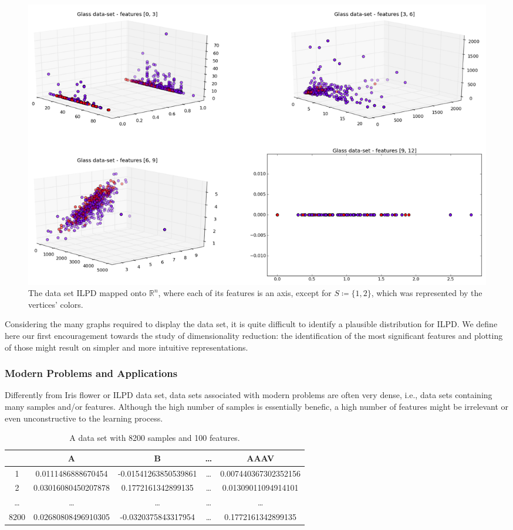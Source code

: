 \documentclass[12pt]{article}
\begin{document}
\begin{figure}[H]
	\centering
	\captionsetup{justification=centering}

	\includegraphics[scale=.3]{experiments/3_1_2_displaying_ilpd}
	\caption{The data set ILPD mapped onto $\mathbb{R}^n$, where each of its features is an axis, except for $S \coloneqq \{1, 2\}$, which was represented by the vertices' colors.}
	\label{fig:disp_ilpd}
\end{figure}

Considering the many graphs required to display the data set, it is quite difficult to identify a plausible distribution for ILPD. We define here our first encouragement towards the study of dimensionality reduction: the identification of the most significant features and plotting of those might result on simpler and more intuitive representations.

\subsubsection{Modern Problems and Applications}

Differently from Iris flower or ILPD data set, data sets associated with modern problems are often very dense, i.e., data sets containing many samples and/or features. Although the high number of samples is essentially benefic, a high number of features might be irrelevant or even unconstructive to the learning process. \cite{cay2005}

\begin{table}[H]
	\begin{tabular}{ c | *{4}{|c}| }
		& A & B & … & AAAV \\  & 0.0111486888670454 & -0.01541263850539861 & … & 0.007440367302352156 \\
		2 & 0.03016080450207878 & 0.1772161342899135 & … & 0.01309011094914101 \\
		… & … & … & … & … \\
		8200 & 0.02680808496910305 & -0.0320375843317954 & … & 0.1772161342899135 \\
	\end{tabular}

	\caption{A data set with 8200 samples and 100 features.}
\end{table}
\end{document}
